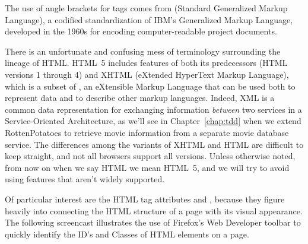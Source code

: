   \begin{sidebar}{}%
  The use of angle brackets for tags
  comes from  (Standard Generalized Markup Language),
  a codified standardization of IBM's Generalized Markup
  Language, developed  in the 1960s for encoding
  computer-readable project documents.
  \end{sidebar}

There is an unfortunate and confusing mess of terminology surrounding the
%
{lineage of HTML}.  HTML~5
includes features of both its predecessors
(HTML versions 1 through 4) and XHTML
(eXtended HyperText Markup Language),
which is a subset of , an eXtensible Markup Language
that can be used both to represent data and to describe other markup
languages.  Indeed, XML is a common data representation for exchanging
information \emph{between} two services in a Service-Oriented
Architecture,
as we'll see in
Chapter~\ref{chap:tdd} when we extend RottenPotatoes to retrieve
movie information from a separate movie database service.  The
differences among the variants of XHTML and HTML are difficult to keep
straight, and not all browsers support all versions.  Unless otherwise
noted, from now on when we say HTML we mean
HTML~5, and we will try to avoid using features that aren't widely
supported.


Of particular interest are the HTML tag attributes  and ,
because they figure heavily into connecting the HTML structure of a
page with its visual appearance.  The
following screencast illustrates the use of Firefox's Web Developer
toolbar to quickly identify the ID's and Classes of HTML elements on a
page.


